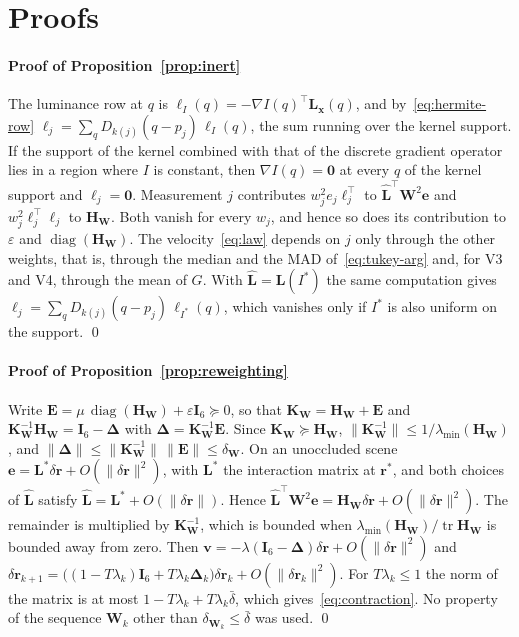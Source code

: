 \documentclass[preprint,12pt]{elsarticle}
\theoremstyle{remark}
\newcommand{\Lh}{\widehat{\mathbf{L}}}
\newcommand{\W}{\mathbf{W}}
\newcommand{\HW}{\mathbf{H}_{\mathbf{W}}}
\newcommand{\KW}{\mathbf{K}_{\mathbf{W}}}
\newcommand{\e}{\mathbf{e}}
\newcommand{\vc}{\mathbf{v}}
\newcommand{\dr}{\delta\mathbf{r}}
\newcommand{\tr}{\operatorname{tr}}
\newcommand{\diag}{\operatorname{diag}}
\begin{document}
\appendix

\section{Proofs}
\label{app:proofs}

\paragraph{Proof of Proposition~\ref{prop:inert}}
The luminance row at $q$ is
$\boldsymbol{\ell}_{I}(q)=-\nabla I(q)^{\top}\mathbf{L}_{\mathbf{x}}(q)$,
and by~\eqref{eq:hermite-row}
$\boldsymbol{\ell}_{j}=\sum_{q}D_{k(j)}(q-p_{j})\,\boldsymbol{\ell}_{I}(q)$, the
sum running over the kernel support. If the support of the kernel combined
with that of the discrete gradient operator lies in a region where $I$ is
constant, then $\nabla I(q)=\mathbf{0}$ at every $q$ of the kernel support and
$\boldsymbol{\ell}_{j}=\mathbf{0}$. Measurement $j$ contributes
$w_{j}^{2}e_{j}\boldsymbol{\ell}_{j}^{\top}$ to $\Lh^{\top}\W^{2}\e$ and
$w_{j}^{2}\boldsymbol{\ell}_{j}^{\top}\boldsymbol{\ell}_{j}$ to $\HW$. Both
vanish for every $w_{j}$, and hence so does its contribution to $\varepsilon$
and $\diag(\HW)$. The velocity~\eqref{eq:law} depends on $j$ only through the
other weights, that is, through the median and the MAD
of~\eqref{eq:tukey-arg} and, for V3 and V4, through the mean of $G$. With
$\Lh=\mathbf{L}(I^{*})$ the same computation gives
$\boldsymbol{\ell}_{j}=\sum_{q}D_{k(j)}(q-p_{j})\,\boldsymbol{\ell}_{I^{*}}(q)$,
which vanishes only if $I^{*}$ is also uniform on the support. \qed

\paragraph{Proof of Proposition~\ref{prop:reweighting}}
Write $\mathbf{E}=\mu\,\diag(\HW)+\varepsilon\mathbf{I}_{6}\succeq0$, so that
$\KW=\HW+\mathbf{E}$ and $\KW^{-1}\HW=\mathbf{I}_{6}-\boldsymbol{\Delta}$ with
$\boldsymbol{\Delta}=\KW^{-1}\mathbf{E}$. Since $\KW\succeq\HW$,
$\lVert\KW^{-1}\rVert\le1/\lambda_{\min}(\HW)$, and
$\lVert\boldsymbol{\Delta}\rVert\le\lVert\KW^{-1}\rVert\,\lVert\mathbf{E}\rVert\le\delta_{\W}$.
On an unoccluded scene
$\e=\mathbf{L}^{*}\dr+O(\lVert\dr\rVert^{2})$, with $\mathbf{L}^{*}$ the
interaction matrix at $\mathbf{r}^{*}$, and both choices of $\Lh$ satisfy
$\Lh=\mathbf{L}^{*}+O(\lVert\dr\rVert)$. Hence
$\Lh^{\top}\W^{2}\e=\HW\dr+O(\lVert\dr\rVert^{2})$. The remainder is
multiplied by $\KW^{-1}$, which is bounded when $\lambda_{\min}(\HW)/\tr\HW$ is
bounded away from zero. Then
$\vc=-\lambda(\mathbf{I}_{6}-\boldsymbol{\Delta})\dr+O(\lVert\dr\rVert^{2})$
and
$\dr_{k+1}=\bigl((1-T\lambda_{k})\mathbf{I}_{6}+T\lambda_{k}\boldsymbol{\Delta}_{k}\bigr)\dr_{k}+O(\lVert\dr_{k}\rVert^{2})$.
For $T\lambda_{k}\le1$ the norm of the matrix is at most
$1-T\lambda_{k}+T\lambda_{k}\bar\delta$, which gives~\eqref{eq:contraction}.
No property of the sequence $\W_{k}$ other than $\delta_{\W_{k}}\le\bar\delta$
was used. \qed
\end{document}
